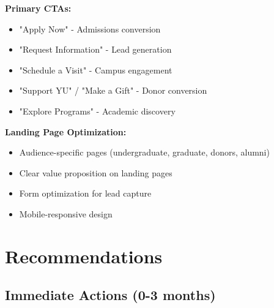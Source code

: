 \documentclass[12pt,letterpaper]{article}
\begin{document}
\textbf{Primary CTAs:}
\begin{itemize}[leftmargin=*]
    \item "Apply Now" - Admissions conversion
    \item "Request Information" - Lead generation
    \item "Schedule a Visit" - Campus engagement
    \item "Support YU" / "Make a Gift" - Donor conversion
    \item "Explore Programs" - Academic discovery
\end{itemize}

\textbf{Landing Page Optimization:}
\begin{itemize}[leftmargin=*]
    \item Audience-specific pages (undergraduate, graduate, donors, alumni)
    \item Clear value proposition on landing pages
    \item Form optimization for lead capture
    \item Mobile-responsive design
\end{itemize}

\section{Recommendations}

\subsection{Immediate Actions (0-3 months)}
\end{document}
